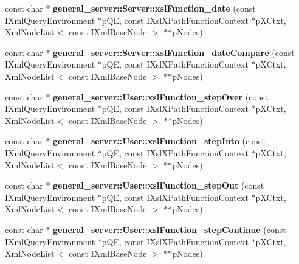 \begin{DoxyCompactItemize}
\item 
\hypertarget{group__XSLModule-Functions_gaf84448baf79bc2f6ed8063898e47cd8d}{const char $\ast$ {\bfseries general\-\_\-server\-::\-Server\-::xsl\-Function\-\_\-date} (const \-I\-Xml\-Query\-Environment $\ast$p\-Q\-E, const \-I\-Xsl\-X\-Path\-Function\-Context $\ast$p\-X\-Ctxt, \-Xml\-Node\-List$<$ const \-I\-Xml\-Base\-Node $>$ $\ast$$\ast$p\-Nodes)}\label{group__XSLModule-Functions_gaf84448baf79bc2f6ed8063898e47cd8d}

\item 
\hypertarget{group__XSLModule-Functions_ga329682b58edd2d65a715b5dec06812be}{const char $\ast$ {\bfseries general\-\_\-server\-::\-Server\-::xsl\-Function\-\_\-date\-Compare} (const \-I\-Xml\-Query\-Environment $\ast$p\-Q\-E, const \-I\-Xsl\-X\-Path\-Function\-Context $\ast$p\-X\-Ctxt, \-Xml\-Node\-List$<$ const \-I\-Xml\-Base\-Node $>$ $\ast$$\ast$p\-Nodes)}\label{group__XSLModule-Functions_ga329682b58edd2d65a715b5dec06812be}

\item 
\hypertarget{group__XSLModule-Functions_ga3b43b34cb221eb0c191fc3bb3982150f}{const char $\ast$ {\bfseries general\-\_\-server\-::\-User\-::xsl\-Function\-\_\-step\-Over} (const \-I\-Xml\-Query\-Environment $\ast$p\-Q\-E, const \-I\-Xsl\-X\-Path\-Function\-Context $\ast$p\-X\-Ctxt, \-Xml\-Node\-List$<$ const \-I\-Xml\-Base\-Node $>$ $\ast$$\ast$p\-Nodes)}\label{group__XSLModule-Functions_ga3b43b34cb221eb0c191fc3bb3982150f}

\item 
\hypertarget{group__XSLModule-Functions_gaa6c4cac1c9a46d26d9ca491f587c8293}{const char $\ast$ {\bfseries general\-\_\-server\-::\-User\-::xsl\-Function\-\_\-step\-Into} (const \-I\-Xml\-Query\-Environment $\ast$p\-Q\-E, const \-I\-Xsl\-X\-Path\-Function\-Context $\ast$p\-X\-Ctxt, \-Xml\-Node\-List$<$ const \-I\-Xml\-Base\-Node $>$ $\ast$$\ast$p\-Nodes)}\label{group__XSLModule-Functions_gaa6c4cac1c9a46d26d9ca491f587c8293}

\item 
\hypertarget{group__XSLModule-Functions_gad0d4159e7674578b99aebc918c9ab025}{const char $\ast$ {\bfseries general\-\_\-server\-::\-User\-::xsl\-Function\-\_\-step\-Out} (const \-I\-Xml\-Query\-Environment $\ast$p\-Q\-E, const \-I\-Xsl\-X\-Path\-Function\-Context $\ast$p\-X\-Ctxt, \-Xml\-Node\-List$<$ const \-I\-Xml\-Base\-Node $>$ $\ast$$\ast$p\-Nodes)}\label{group__XSLModule-Functions_gad0d4159e7674578b99aebc918c9ab025}

\item 
\hypertarget{group__XSLModule-Functions_ga35751a440d6ac4a700264a035b5509db}{const char $\ast$ {\bfseries general\-\_\-server\-::\-User\-::xsl\-Function\-\_\-step\-Continue} (const \-I\-Xml\-Query\-Environment $\ast$p\-Q\-E, const \-I\-Xsl\-X\-Path\-Function\-Context $\ast$p\-X\-Ctxt, \-Xml\-Node\-List$<$ const \-I\-Xml\-Base\-Node $>$ $\ast$$\ast$p\-Nodes)}\label{group__XSLModule-Functions_ga35751a440d6ac4a700264a035b5509db}


\end{DoxyCompactItemize}
